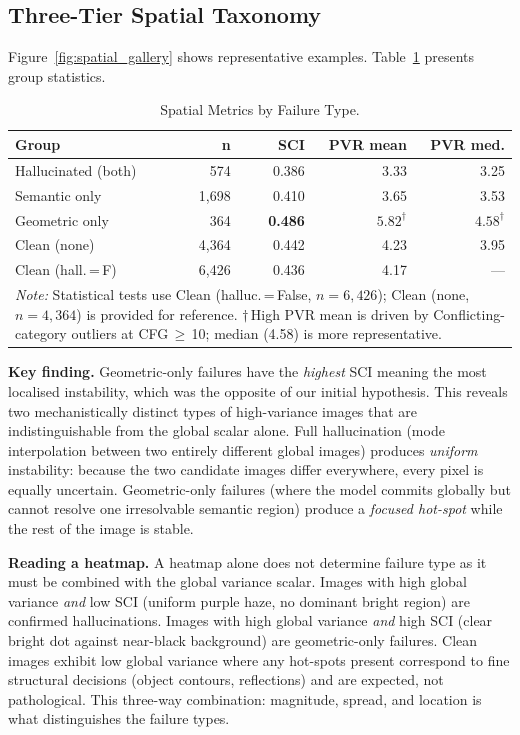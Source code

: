 \documentclass[conference]{IEEEtran}
\begin{document}
\subsection{Three-Tier Spatial Taxonomy}
\label{sec:taxonomy}

Figure~\ref{fig:spatial_gallery} shows representative examples.
Table~\ref{tab:spatial} presents group statistics.

\begin{table}[h]
\centering
\caption{Spatial Metrics by Failure Type.}
\label{tab:spatial}
\small
\begin{tabular}{lrrrr}
\toprule
\textbf{Group} & \textbf{n} & \textbf{SCI} & \textbf{PVR mean} & \textbf{PVR med.} \\
\midrule
Hallucinated (both) & 574   & 0.386 & 3.33 & 3.25 \\
Semantic only       & 1{,}698 & 0.410 & 3.65 & 3.53 \\
Geometric only      & 364   & \textbf{0.486} & $5.82^\dagger$ & $4.58^\dagger$ \\
Clean (none)        & 4{,}364 & 0.442 & 4.23 & 3.95 \\
Clean (hall.\,=\,F) & 6{,}426 & 0.436 & 4.17 & --- \\
\bottomrule
\multicolumn{5}{p{8cm}}{\small\textit{Note:} Statistical tests use Clean (halluc.\,=\,False, $n{=}6{,}426$); Clean (none, $n{=}4{,}364$) is provided for reference. $\dagger$\,High PVR mean is driven by Conflicting-category outliers at CFG\,${\geq}$\,10; median (4.58) is more representative.}
\end{tabular}
\end{table}

\textbf{Key finding.} Geometric-only failures have the \emph{highest}
SCI meaning the most localised instability, which was the opposite of our
initial hypothesis. This reveals two mechanistically distinct types
of high-variance images that are indistinguishable from the global
scalar alone. Full hallucination (mode interpolation between two
entirely different global images) produces \emph{uniform} instability:
because the two candidate images differ everywhere, every pixel is
equally uncertain. Geometric-only failures (where the model commits
globally but cannot resolve one irresolvable semantic region) produce
a \emph{focused hot-spot} while the rest of the image is stable.

\textbf{Reading a heatmap.} A heatmap alone does not determine failure
type as it must be combined with the global variance scalar. Images with
high global variance \emph{and} low SCI (uniform purple haze, no
dominant bright region) are confirmed hallucinations. Images with high
global variance \emph{and} high SCI (clear bright dot against near-black
background) are geometric-only failures. Clean images exhibit low global
variance where any hot-spots present correspond to fine structural decisions
(object contours, reflections) and are expected, not pathological.
This three-way combination: magnitude, spread, and location is what
distinguishes the failure types.
\end{document}
